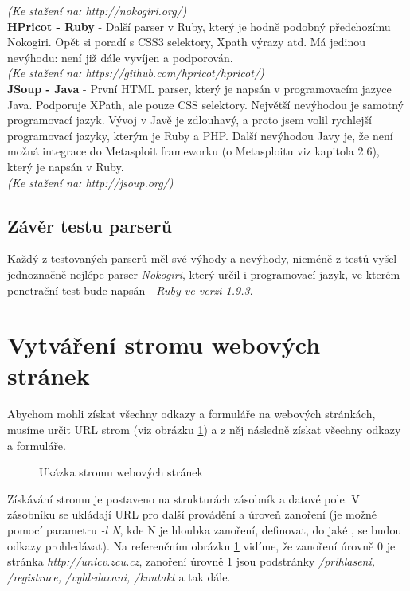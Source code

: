 \textit{(Ke stažení na: http://nokogiri.org/)}\\
\newline
\textbf{HPricot - Ruby} - Další parser v Ruby, který je hodně podobný předchozímu Nokogiri. Opět si poradí s CSS3 selektory, Xpath výrazy atd. Má jedinou nevýhodu: není již dále vyvíjen a podporován.\\
\textit{(Ke stažení na: https://github.com/hpricot/hpricot/)}\\
\newline
\textbf{JSoup - Java} - První HTML parser, který je napsán v programovacím jazyce Java. Podporuje XPath, ale pouze CSS selektory. Největší nevýhodou je samotný programovací jazyk. Vývoj v Javě je zdlouhavý, a proto jsem volil rychlejší programovací jazyky, kterým je Ruby a PHP. Další nevýhodou Javy je, že není možná integrace do Metasploit frameworku (o Metasploitu viz kapitola 2.6), který je napsán v Ruby.\\
\textit{(Ke stažení na: http://jsoup.org/)}

\subsection{Závěr testu parserů}
Každý z testovaných parserů měl své výhody a nevýhody, nicméně z testů vyšel jednoznačně nejlépe parser \textit{Nokogiri}, který určil i programovací jazyk, ve kterém penetrační test bude napsán - \textit{Ruby ve verzi 1.9.3}. 

\section{Vytváření stromu webových stránek}
Abychom mohli získat všechny odkazy a formuláře na webových stránkách, musíme určit URL strom (viz obrázku \ref{obr.url_stack}) a z něj následně získat všechny odkazy a formuláře.
\begin{figure}[h!]
\caption{Ukázka stromu webových stránek}
\label{obr.url_stack}
\end{figure}
Získávání stromu je postaveno na strukturách zásobník a datové pole. V zásobníku se ukládají URL pro další provádění a úroveň zanoření (je možné pomocí parametru \textit{-l N}, kde N je hloubka zanoření, definovat, do jaké , se budou odkazy prohledávat). Na referenčním obrázku \ref{obr.url_stack} vidíme, že zanoření úrovně 0 je stránka \textit{http://unicv.zcu.cz}, zanoření úrovně 1 jsou podstránky \textit{/prihlaseni, /registrace, /vyhledavani, /kontakt} a tak dále.

